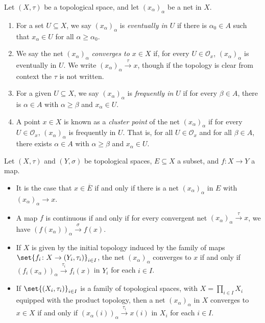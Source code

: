 \begin{definition}\label{def:cluster_points}
  Let $\left(X,\tau\right)$ be a topological space, and let $\left(x_{\alpha}\right)_{\alpha}$ be a net in $X$.
  \begin{enumerate}[(1)]
    \item For a set $U\subseteq X$, we say $\left(x_{\alpha}\right)_{\alpha}$ is \textit{eventually in $U$} if there is $\alpha_0\in A$ such that $x_{\alpha}\in U$ for all $\alpha \geq \alpha_0$.
    \item We say the net $\left(x_{\alpha}\right)_{\alpha}$ \textit{converges to $x\in X$} if, for every $U\in \mathcal{O}_{x}$, $\left(x_{\alpha}\right)_{\alpha}$ is eventually in $U$. We write $\left(x_{\alpha}\right)_{\alpha}\xrightarrow{\tau}x$, though if the topology is clear from context the $\tau$ is not written.
    \item For a given $U\subseteq X$, we say $\left(x_{\alpha}\right)_{\alpha}$ is \textit{frequently in $U$} if for every $\beta \in A$, there is $\alpha \in A$ with $\alpha \geq \beta$ and $x_{\alpha}\in U$.
    \item A point $x\in X$ is known as a \textit{cluster point} of the net $\left(x_{\alpha}\right)_{\alpha}$ if for every $U\in \mathcal{O}_{x}$, $\left(x_{\alpha}\right)_{\alpha}$ is frequently in $U$. That is, for all $U\in \mathcal{O}_{x}$ and for all $\beta \in A$, there exists $\alpha \in A$ with $\alpha \geq \beta$ and $x_{\alpha}\in U$.
  \end{enumerate}
\end{definition}
\begin{fact}
  Let $\left(X,\tau\right)$ and $\left(Y,\sigma\right)$ be topological spaces, $E\subseteq X$ a subset, and $f\colon X\rightarrow Y$ a map.
  \begin{itemize}
    \item It is the case that $x\in \overline{E}$ if and only if there is a net $\left(x_{\alpha}\right)_{\alpha}$ in $E$ with $\left(x_{\alpha}\right)_{\alpha}\rightarrow x$.
    \item A map $f$ is continuous if and only if for every convergent net $\left(x_{\alpha}\right)_{\alpha}\xrightarrow{\tau}x$, we have $\left(f\left(x_{\alpha}\right)\right)_{\alpha}\xrightarrow{\sigma}f(x)$.
    \item If $X$ is given by the initial topology induced by the family of maps $\set{f_i\colon X\rightarrow \left(Y_i,\tau_i\right)}_{i\in I}$, the net $\left(x_{\alpha}\right)_{\alpha}$ converges to $x$ if and only if $\left(f_i\left(x_{\alpha}\right)\right)_{\alpha}\xrightarrow{\tau_i}f_i\left(x\right)$ in $Y_i$ for each $i\in I$.
    \item If $\set{\left(X_i,\tau_i\right)}_{i\in I}$ is a family of topological spaces, with $X = \prod_{i\in I}X_i$ equipped with the product topology, then a net $\left(x_{\alpha}\right)_{\alpha}$ in $X$ converges to $x\in X$ if and only if $\left(x_{\alpha}\left(i\right)\right)_{\alpha}\xrightarrow{\tau_i} x\left(i\right)$ in $X_i$ for each $i\in I$.
  \end{itemize}
\end{fact}
